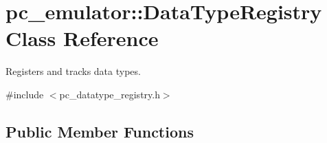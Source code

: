 \hypertarget{classpc__emulator_1_1DataTypeRegistry}{}\section{pc\+\_\+emulator\+:\+:Data\+Type\+Registry Class Reference}
\label{classpc__emulator_1_1DataTypeRegistry}


Registers and tracks data types.  




{\ttfamily \#include $<$pc\+\_\+datatype\+\_\+registry.\+h$>$}

\subsection*{Public Member Functions}
